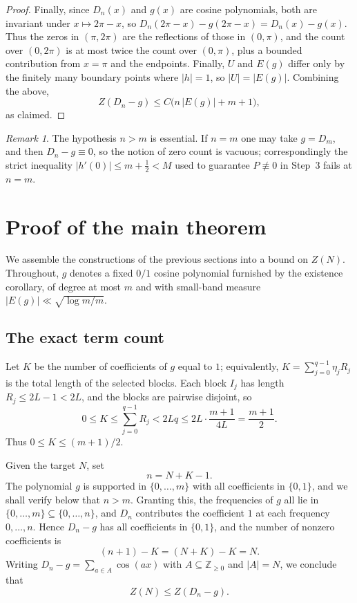 \documentclass[11pt,reqno]{amsart}
\theoremstyle{plain}
\theoremstyle{definition}
\theoremstyle{remark}
\newtheorem{remark}{Remark}
\begin{document}
\begin{proof}
Finally, since $D_n(x)$ and $g(x)$ are cosine polynomials, both are invariant under $x\mapsto 2\pi-x$, so $D_n(2\pi-x)-g(2\pi-x)=D_n(x)-g(x)$. Thus the zeros in $(\pi,2\pi)$ are the reflections of those in $(0,\pi)$, and the count over $(0,2\pi)$ is at most twice the count over $(0,\pi)$, plus a bounded contribution from $x=\pi$ and the endpoints. Finally, $U$ and $E(g)$ differ only by the finitely many boundary points where $|h|=1$, so $|U|=|E(g)|$. Combining the above,
\[
  Z(D_n-g)\le C\bigl(n\,|E(g)|+m+1\bigr),
\]
as claimed.
\end{proof}

\begin{remark}
The hypothesis $n>m$ is essential. If $n=m$ one may take $g=D_m$, and then $D_n-g\equiv0$, so the notion of zero count is vacuous; correspondingly the strict inequality $|h'(0)|\le m+\tfrac12<M$ used to guarantee $P\not\equiv0$ in Step~3 fails at $n=m$.
\end{remark}

\section{Proof of the main theorem}

We assemble the constructions of the previous sections into a bound on $Z(N)$. Throughout, $g$ denotes a fixed $0/1$ cosine polynomial furnished by the existence corollary, of degree at most $m$ and with small-band measure $\lvert E(g)\rvert \ll \sqrt{\log m / m}$.

\subsection*{The exact term count}

Let $K$ be the number of coefficients of $g$ equal to $1$; equivalently, $K=\sum_{j=0}^{q-1}\eta_j R_j$ is the total length of the selected blocks. Each block $I_j$ has length $R_j\le 2L-1<2L$, and the blocks are pairwise disjoint, so
\[
0\le K\le \sum_{j=0}^{q-1} R_j < 2Lq \le 2L\cdot\frac{m+1}{4L}=\frac{m+1}{2}.
\]
Thus $0\le K\le (m+1)/2$.

Given the target $N$, set
\[
n=N+K-1.
\]
The polynomial $g$ is supported in $\{0,\dots,m\}$ with all coefficients in $\{0,1\}$, and we shall verify below that $n>m$. Granting this, the frequencies of $g$ all lie in $\{0,\dots,m\}\subseteq\{0,\dots,n\}$, and $D_n$ contributes the coefficient $1$ at each frequency $0,\dots,n$. Hence $D_n-g$ has all coefficients in $\{0,1\}$, and the number of nonzero coefficients is
\[
(n+1)-K=(N+K)-K=N.
\]
Writing $D_n-g=\sum_{a\in A}\cos(ax)$ with $A\subseteq\mathbb Z_{\ge 0}$ and $\lvert A\rvert=N$, we conclude that
\[
Z(N)\le Z(D_n-g).
\]
\end{document}
